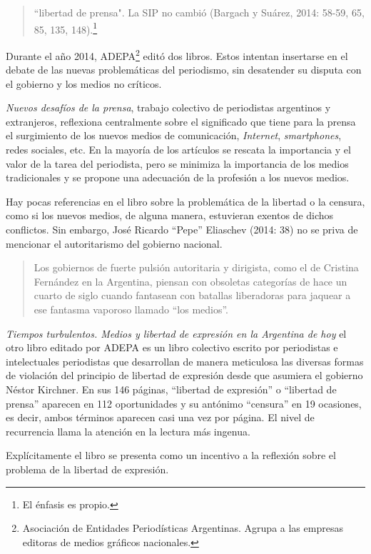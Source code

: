 {\begin{quote}
``libertad de prensa". La SIP no cambió (Bargach y Suárez, 2014: 58-59, 65, 85, 135, 148).\footnote{El énfasis es propio.}
\end{quote}

Durante el año 2014, ADEPA\footnote{Asociación de Entidades Periodísticas Argentinas. Agrupa a las empresas editoras de medios gráficos nacionales.} editó dos libros. Estos intentan insertarse en el debate de las nuevas problemáticas del periodismo, sin desatender su disputa con el gobierno y los medios no críticos.

\emph{Nuevos desafíos de la prensa}, trabajo colectivo de periodistas argentinos y extranjeros, reflexiona centralmente sobre el significado que tiene para la prensa el surgimiento de los nuevos medios de comunicación, \emph{Internet}, \emph{smartphones}, redes sociales, etc. En la mayoría de los artículos se rescata la importancia y el valor de la tarea del periodista, pero se minimiza la importancia de los medios tradicionales y se propone una adecuación de la profesión a los nuevos medios.

Hay pocas referencias en el libro sobre la problemática de la libertad o la censura, como si los nuevos medios, de alguna manera, estuvieran exentos de dichos conflictos. Sin embargo, José Ricardo ``Pepe'' Eliaschev (2014: 38) no se priva de mencionar el autoritarismo del gobierno nacional.

\begin{quote}
Los gobiernos de fuerte pulsión autoritaria y dirigista, como el de Cristina Fernández en la Argentina, piensan con obsoletas categorías de hace un cuarto de siglo cuando fantasean con batallas liberadoras para jaquear a ese fantasma vaporoso llamado ``los medios''.
\end{quote}

\emph{Tiempos turbulentos. Medios y libertad de expresión en la Argentina de hoy} el otro libro editado por ADEPA es un libro colectivo escrito por periodistas e intelectuales periodistas que desarrollan de manera meticulosa las diversas formas de violación del principio de libertad de expresión desde que asumiera el gobierno Néstor Kirchner. En sus 146 páginas, ``libertad de expresión'' o ``libertad de prensa'' aparecen en 112 oportunidades y su antónimo ``censura'' en 19 ocasiones, es decir, ambos términos aparecen casi una vez por página. El nivel de recurrencia llama la atención en la lectura más ingenua.

Explícitamente el libro se presenta como un incentivo a la reflexión sobre el problema de la libertad de expresión.

}
